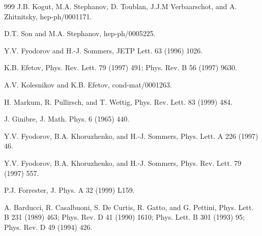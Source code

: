 \begin{thebibliography}{999}
       J.B. Kogut, M.A. Stephanov, D. Toublan, J.J.M
                      Verbaarschot, and A. Zhitnitsky, 
                      hep-ph/0001171.                           %

   D.T. Son and M.A. Stephanov,
                      hep-ph/0005225.

   Y.V. Fyodorov and H.-J. Sommers, 
                      JETP Lett. 63 (1996) 1026.                %

    K.B. Efetov, 
                      Phys. Rev. Lett. 79 (1997) 491;           %
                      Phys. Rev. B 56 (1997) 9630.              %
 
   A.V. Kolesnikov and K.B. Efetov,
                      cond-mat/0001263.                         %

      H. Markum, R. Pullirsch, and T. Wettig,
                      Phys. Rev. Lett. 83 (1999) 484.           %

     J. Ginibre, 
                      J. Math. Phys. 6 (1965) 440.             %

    Y.V. Fyodorov, B.A. Khoruzhenko, and H.-J. Sommers,
                      Phys. Lett.  A 226 (1997) 46.              %

 Y.V. Fyodorov, B.A. Khoruzhenko, and H.-J. Sommers,
                      Phys. Rev. Lett. 79 (1997) 557.            %

    P.J. Forrester,
                      J. Phys. A 32 (1999) L159.                  %

    A. Barducci, R. Casalbuoni, S. De Curtis,
                      R. Gatto,  and G. Pettini,
                      Phys. Lett. B 231 (1989) 463;            %
                      Phys. Rev. D 41 (1990) 1610;             %
                      Phys. Lett. B 301 (1993) 95;             %
                      Phys. Rev. D 49 (1994) 426.              %


\end{thebibliography}
